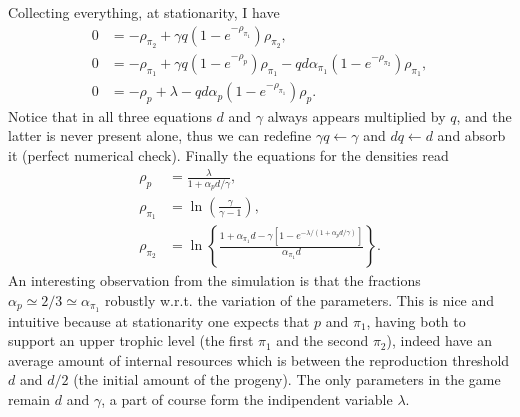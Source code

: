 \documentclass[10pt]{article}
\begin{document}
Collecting everything, at stationarity, I have
\begin{align}
0 &= -\rho_{\pi_2}+ \gamma q (1-e^{-\rho_{\pi_1}})\rho_{\pi_2}, \nonumber \\
0 &= -\rho_{\pi_1}+ \gamma q (1-e^{-\rho_p})\rho_{\pi_1}-qd\alpha_{\pi_1}(1-e^{-\rho_{\pi_2}})\rho_{\pi_1}, \\
0 &= -\rho_p +\lambda-qd\alpha_p(1-e^{-\rho_{\pi_1}})\rho_p. \nonumber
\end{align}
Notice that in all three equations $d$ and $\gamma$ always appears multiplied by $q$, and the latter
is never present alone, thus we can redefine $\gamma q\leftarrow \gamma$ and $dq\leftarrow d$ and absorb it
(perfect numerical check).
Finally the equations for the densities read
\begin{align}
\label{eq:three-levels}
\rho_p &=\frac{\lambda }{1+\alpha_p d /\gamma} , \nonumber \\
\rho_{\pi_1} &= \ln \left(\frac{\gamma}{\gamma -1}\right), \\
\rho_{\pi_2} &= \ln \left\{\frac{1+ \alpha_{\pi_1}d -\gamma  \left[1-e^{-\lambda / (1+\alpha_p d /\gamma)}\right]}{\alpha_{\pi_1}d} \right\}. \nonumber
\end{align}
An interesting observation from the simulation is that the fractions $\alpha_p\simeq 2/3 \simeq\alpha_{\pi_1}$
robustly w.r.t. the variation of the parameters. This is nice and intuitive because at stationarity one
expects that $p$ and $\pi_1$, having both to support an upper trophic level
(the first $\pi_1$ and the second $\pi_2$),
indeed have an average amount of internal resources which is between the reproduction
threshold $d$ and $d/2$ (the initial amount of the progeny). The only parameters in the game remain $d$ and $\gamma$,
a part of course form the indipendent variable $\lambda$.
\end{document}
